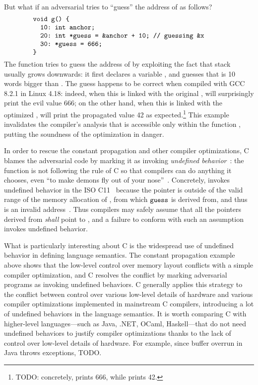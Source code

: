 But what if an adversarial  tries to ``guess'' the address of  as follows?
%
\[
\begin{minipage}{0.8\textwidth}
\begin{verbatim}
void g() {
  10: int anchor;
  20: int *guess = &anchor + 10; // guessing &x
  30: *guess = 666;
}
\end{verbatim}
\end{minipage}
\]
%
\noindent The function  tries to guess the address of  by exploiting the fact that
stack usually grows downwards: it first declares a variable , and guesses that
 is 10 words bigger than .  The guess happens to be correct when compiled
with GCC 8.2.1 in Linux 4.18: indeed, when this  is linked with the original ,
 will surprisingly print the evil value 666; on the other hand, when this  is
linked with the optimized ,  will print the propagated value 42 as
expected.\footnote{TODO: concretely, 
  prints 666, while  prints 42.}
This example invalidates the compiler's analysis that  is accessible only within the
function , putting the soundness of the optimization in danger.

In order to rescue the constant propagation and other compiler optimizations, C blames the
adversarial code by marking it as invoking \emph{undefined behavior}~\cite{undefined-behavior}: the
function  is not following the rule of C so that compilers can do anything it chooses,
even ``to make demons fly out of your nose''~\cite{nasal-demons}.  Concretely,  invokes
undefined behavior in the ISO C11~\cite{c11} because the pointer  is outside of the
valid range of the memory allocation of , from which $\texttt{guess}$ is derived from,
and thus  is an invalid address~\cite{c11-6.5.6p8}.  Thus compilers may safely assume
that all the pointers derived from  \emph{shall} point to , and a failure
to conform with such an assumption invokes undefined behavior.

What is particularly interesting about C is the widespread use of undefined behavior in defining
language semantics.  The constant propagation example above shows that the low-level control over
memory layout conflicts with a simple compiler optimization, and C resolves the conflict by marking
adversarial programs as invoking undefined behaviors.  C generally applies this strategy to the
conflict between control over various low-level details of hardware and various compiler
optimizations implemented in mainstream C compilers, introducing a lot of undefined behaviors in the
language semantics.  It is worth comparing C with higher-level languages---such as Java, .NET,
OCaml, Haskell---that do not need undefined behaviors to justify compiler optimizations thanks to
the lack of control over low-level details of hardware.  For example, since buffer overrun in Java
throws exceptions, TODO.


